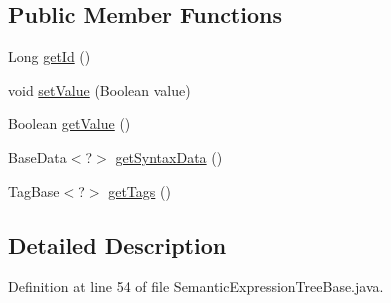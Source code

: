 \subsection*{Public Member Functions}
\begin{DoxyCompactItemize}
\item 
Long \hyperlink{interfaceit_1_1emarolab_1_1cagg_1_1core_1_1evaluation_1_1semanticGrammar_1_1syntaxCompiler_1_1Se776f6389441f31f1bb3271e5a57601d8_ad0f63c2eb98a1ce5e22726061bfb9e09}{get\-Id} ()
\item 
void \hyperlink{interfaceit_1_1emarolab_1_1cagg_1_1core_1_1evaluation_1_1semanticGrammar_1_1syntaxCompiler_1_1Se776f6389441f31f1bb3271e5a57601d8_ad738cb84bb9fd74a620894156756a343}{set\-Value} (Boolean value)
\item 
Boolean \hyperlink{interfaceit_1_1emarolab_1_1cagg_1_1core_1_1evaluation_1_1semanticGrammar_1_1syntaxCompiler_1_1Se776f6389441f31f1bb3271e5a57601d8_a2a23223636b3c88982a5c153f29a80a6}{get\-Value} ()
\item 
Base\-Data$<$?$>$ \hyperlink{interfaceit_1_1emarolab_1_1cagg_1_1core_1_1evaluation_1_1semanticGrammar_1_1syntaxCompiler_1_1Se776f6389441f31f1bb3271e5a57601d8_a5285064fb1f4d3f4c104fd728c3d6b24}{get\-Syntax\-Data} ()
\item 
Tag\-Base$<$?$>$ \hyperlink{interfaceit_1_1emarolab_1_1cagg_1_1core_1_1evaluation_1_1semanticGrammar_1_1syntaxCompiler_1_1Se776f6389441f31f1bb3271e5a57601d8_abac9ac23202f84c091be91c29ea886bd}{get\-Tags} ()
\end{DoxyCompactItemize}


\subsection{Detailed Description}


Definition at line 54 of file Semantic\-Expression\-Tree\-Base.\-java.



